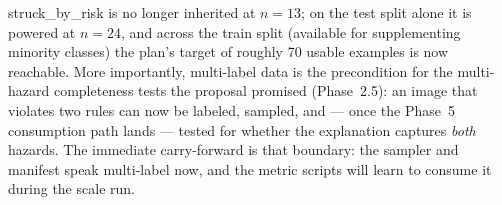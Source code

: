 struck\_by\_risk is no longer inherited at $n=13$; on the test split alone it is powered at $n=24$, and
across the train split (available for supplementing minority classes) the plan's target of roughly 70
usable examples is now reachable. More importantly, multi-label data is the precondition for the
multi-hazard completeness tests the proposal promised (Phase~2.5): an image that violates two rules can
now be labeled, sampled, and --- once the Phase~5 consumption path lands --- tested for whether the
explanation captures \emph{both} hazards. The immediate carry-forward is that boundary: the sampler and
manifest speak multi-label now, and the metric scripts will learn to consume it during the scale run.
